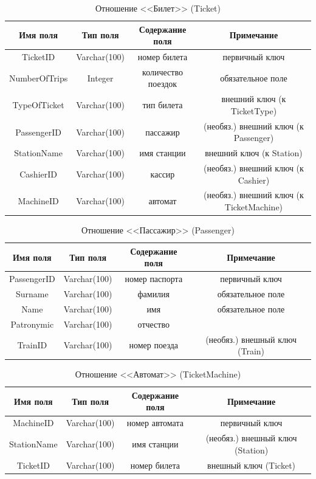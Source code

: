 \documentclass[a4paper,10pt]{article}
\theoremstyle{plain} %
\theoremstyle{definition} %
\theoremstyle{remark} %
\theoremstyle{definition}
\begin{document}
\begin{table}[h!]
\centering
\begin{tabular}{|c|c|c|c|}
\hline
    Имя поля & Тип поля & Содержание поля & Примечание \\
    \hline
    TicketID & Varchar(100) & номер билета & первичный ключ  \\
    NumberOfTrips & Integer & количество поездок & обязательное поле \\
    TypeOfTicket & Varchar(100) & тип билета & внешний ключ (к TicketType) \\
    PassengerID & Varchar(100) & пассажир & (необяз.) внешний ключ (к Passenger) \\
    StationName & Varchar(100) & имя станции & внешний ключ (к Station) \\
    CashierID & Varchar(100) & кассир & (необяз.) внешний ключ (к Cashier) \\
    MachineID & Varchar(100) & автомат & (необяз.) внешний ключ (к TicketMachine) \\
    \hline
\end{tabular}
    \caption{Отношение <<Билет>> (Ticket)}
\end{table}


\begin{table}[h!]
\centering
\begin{tabular}{|c|c|c|c|}
\hline
    Имя поля & Тип поля & Содержание поля & Примечание \\
    \hline
    PassengerID & Varchar(100) & номер паспорта & первичный ключ \\
    Surname & Varchar(100) & фамилия & обязательное поле \\
    Name & Varchar(100) & имя & обязательное поле \\
    Patronymic & Varchar(100) & отчество & \\
    TrainID & Varchar(100) & номер поезда & (необяз.) внешный ключ (Train) \\
    \hline
\end{tabular}
    \caption{Отношение <<Пассажир>> (Passenger)}
\end{table}

\begin{table}[h!]
\centering
\begin{tabular}{|c|c|c|c|}
\hline
    Имя поля & Тип поля & Содержание поля & Примечание \\
    \hline
    MachineID & Varchar(100) & номер автомата & первичный ключ \\
    StationName & Varchar(100) & имя станции &  (необяз.) внешный ключ (Station) \\
    TicketID & Varchar(100) & номер билета & внешный ключ (Ticket) \\
    \hline
\end{tabular}
    \caption{Отношение <<Автомат>> (TicketMachine)}
\end{table}
\end{document}
